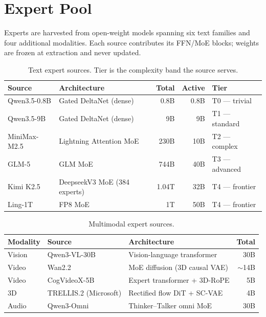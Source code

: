 \documentclass[11pt,a4paper]{article}
\begin{document}
\section{Expert Pool}

Experts are harvested from open-weight models spanning six text families and four
additional modalities. Each source contributes its FFN/MoE blocks; weights are frozen at
extraction and never updated.

\begin{table}[H]
\centering
\caption{Text expert sources. Tier is the complexity band the source serves.}
\begin{tabular}{llrrl}
\toprule
\textbf{Source} & \textbf{Architecture} & \textbf{Total} & \textbf{Active} & \textbf{Tier} \\
\midrule
Qwen3.5-0.8B & Gated DeltaNet (dense)       & 0.8B  & 0.8B & T0 --- trivial \\
Qwen3.5-9B   & Gated DeltaNet (dense)       & 9B    & 9B   & T1 --- standard \\
MiniMax-M2.5 & Lightning Attention MoE      & 230B  & 10B  & T2 --- complex \\
GLM-5        & GLM MoE                      & 744B  & 40B  & T3 --- advanced \\
Kimi K2.5    & DeepseekV3 MoE (384 experts) & 1.04T & 32B  & T4 --- frontier \\
Ling-1T      & FP8 MoE                      & 1T    & 50B  & T4 --- frontier \\
\bottomrule
\end{tabular}
\end{table}

\begin{table}[H]
\centering
\caption{Multimodal expert sources.}
\begin{tabular}{lllr}
\toprule
\textbf{Modality} & \textbf{Source} & \textbf{Architecture} & \textbf{Total} \\
\midrule
Vision & Qwen3-VL-30B          & Vision-language transformer   & 30B \\
Video  & Wan2.2                & MoE diffusion (3D causal VAE) & $\sim$14B \\
Video  & CogVideoX-5B          & Expert transformer + 3D-RoPE  & 5B \\
3D     & TRELLIS.2 (Microsoft) & Rectified flow DiT + SC-VAE   & 4B \\
Audio  & Qwen3-Omni            & Thinker--Talker omni MoE      & 30B \\
\bottomrule
\end{tabular}
\end{table}
\end{document}
